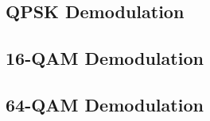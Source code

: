 \documentclass[]{article}
\begin{document}
\subsection{QPSK Demodulation}
\label{app:qpsk_demod}

\cleardoublepage
\newpage

\subsection{16-QAM Demodulation}
\label{app:qam_16_demod}

\cleardoublepage
\newpage

\subsection{64-QAM Demodulation}
\label{app:qam_64_demod}

\cleardoublepage
\newpage
\end{document}

